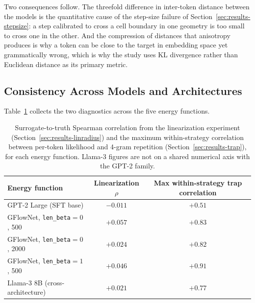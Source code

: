 

Two consequences follow. The threefold difference in inter-token distance between the models is the quantitative cause of the step-size failure of Section~\ref{sec:results-stepsize}: a step calibrated to cross a cell boundary in one geometry is too small to cross one in the other. And the compression of distances that anisotropy produces is why a token can be close to the target in embedding space yet grammatically wrong, which is why the study uses KL divergence rather than Euclidean distance as its primary metric.

\subsection{Consistency Across Models and Architectures}
\label{sec:results-crossmodel}

Table~\ref{tab:crossmodel} collects the two diagnostics across the five energy functions.

\begin{table}[t]
    \centering
    \small
    \setlength{\tabcolsep}{4pt}
    \begin{tabular}{lcc}
        \toprule
        Energy function & Linearization $\rho$ & Max within-strategy trap correlation \\
        \midrule
        GPT-2 Large (SFT base)              & $-0.011$ & $+0.51$ \\
        GFlowNet, \texttt{len\_beta}$=0$, 500  & $+0.057$ & $+0.83$ \\
        GFlowNet, \texttt{len\_beta}$=0$, 2000 & $+0.024$ & $+0.82$ \\
        GFlowNet, \texttt{len\_beta}$=1$, 500  & $+0.046$ & $+0.91$ \\
        Llama-3 8B (cross-architecture)     & $+0.021$ & $+0.77$ \\
        \bottomrule
    \end{tabular}
    \caption[Two diagnostics across the five energy functions.]{Surrogate-to-truth Spearman correlation from the linearization experiment (Section~\ref{sec:results-linradius}) and the maximum within-strategy correlation between per-token likelihood and 4-gram repetition (Section~\ref{sec:results-trap}), for each energy function. Llama-3 figures are not on a shared numerical axis with the GPT-2 family.}
    \label{tab:crossmodel}
\end{table}

